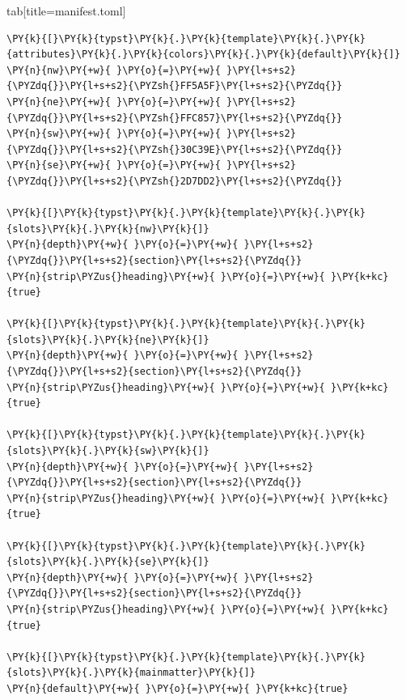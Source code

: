 \documentclass[a4paper,twoside]{article}
\begin{document}
\begin{tsdiv}{tab}[title=manifest.toml]
\begin{tscode}[lang=toml, engine=pygments]
\begin{Verbatim}[commandchars=\\\{\},breaklines, breakanywhere, commandchars=\\\{\}]
\PY{k}{[}\PY{k}{typst}\PY{k}{.}\PY{k}{template}\PY{k}{.}\PY{k}{attributes}\PY{k}{.}\PY{k}{colors}\PY{k}{.}\PY{k}{default}\PY{k}{]}
\PY{n}{nw}\PY{+w}{ }\PY{o}{=}\PY{+w}{ }\PY{l+s+s2}{\PYZdq{}}\PY{l+s+s2}{\PYZsh{}FF5A5F}\PY{l+s+s2}{\PYZdq{}}
\PY{n}{ne}\PY{+w}{ }\PY{o}{=}\PY{+w}{ }\PY{l+s+s2}{\PYZdq{}}\PY{l+s+s2}{\PYZsh{}FFC857}\PY{l+s+s2}{\PYZdq{}}
\PY{n}{sw}\PY{+w}{ }\PY{o}{=}\PY{+w}{ }\PY{l+s+s2}{\PYZdq{}}\PY{l+s+s2}{\PYZsh{}30C39E}\PY{l+s+s2}{\PYZdq{}}
\PY{n}{se}\PY{+w}{ }\PY{o}{=}\PY{+w}{ }\PY{l+s+s2}{\PYZdq{}}\PY{l+s+s2}{\PYZsh{}2D7DD2}\PY{l+s+s2}{\PYZdq{}}

\PY{k}{[}\PY{k}{typst}\PY{k}{.}\PY{k}{template}\PY{k}{.}\PY{k}{slots}\PY{k}{.}\PY{k}{nw}\PY{k}{]}
\PY{n}{depth}\PY{+w}{ }\PY{o}{=}\PY{+w}{ }\PY{l+s+s2}{\PYZdq{}}\PY{l+s+s2}{section}\PY{l+s+s2}{\PYZdq{}}
\PY{n}{strip\PYZus{}heading}\PY{+w}{ }\PY{o}{=}\PY{+w}{ }\PY{k+kc}{true}

\PY{k}{[}\PY{k}{typst}\PY{k}{.}\PY{k}{template}\PY{k}{.}\PY{k}{slots}\PY{k}{.}\PY{k}{ne}\PY{k}{]}
\PY{n}{depth}\PY{+w}{ }\PY{o}{=}\PY{+w}{ }\PY{l+s+s2}{\PYZdq{}}\PY{l+s+s2}{section}\PY{l+s+s2}{\PYZdq{}}
\PY{n}{strip\PYZus{}heading}\PY{+w}{ }\PY{o}{=}\PY{+w}{ }\PY{k+kc}{true}

\PY{k}{[}\PY{k}{typst}\PY{k}{.}\PY{k}{template}\PY{k}{.}\PY{k}{slots}\PY{k}{.}\PY{k}{sw}\PY{k}{]}
\PY{n}{depth}\PY{+w}{ }\PY{o}{=}\PY{+w}{ }\PY{l+s+s2}{\PYZdq{}}\PY{l+s+s2}{section}\PY{l+s+s2}{\PYZdq{}}
\PY{n}{strip\PYZus{}heading}\PY{+w}{ }\PY{o}{=}\PY{+w}{ }\PY{k+kc}{true}

\PY{k}{[}\PY{k}{typst}\PY{k}{.}\PY{k}{template}\PY{k}{.}\PY{k}{slots}\PY{k}{.}\PY{k}{se}\PY{k}{]}
\PY{n}{depth}\PY{+w}{ }\PY{o}{=}\PY{+w}{ }\PY{l+s+s2}{\PYZdq{}}\PY{l+s+s2}{section}\PY{l+s+s2}{\PYZdq{}}
\PY{n}{strip\PYZus{}heading}\PY{+w}{ }\PY{o}{=}\PY{+w}{ }\PY{k+kc}{true}

\PY{k}{[}\PY{k}{typst}\PY{k}{.}\PY{k}{template}\PY{k}{.}\PY{k}{slots}\PY{k}{.}\PY{k}{mainmatter}\PY{k}{]}
\PY{n}{default}\PY{+w}{ }\PY{o}{=}\PY{+w}{ }\PY{k+kc}{true}
\end{Verbatim}
\end{tscode}
\end{tsdiv}
\end{document}
